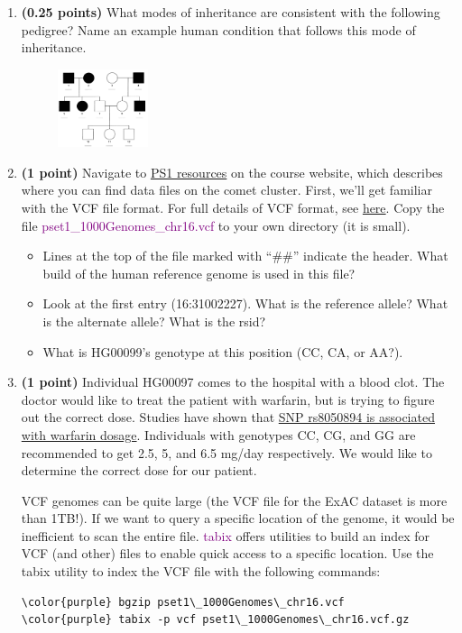 \documentclass[12pt]{article}
\begin{document}
\begin{enumerate}
\item \textbf{(0.25 points)} What modes of inheritance are consistent with the following pedigree? Name an example human condition that follows this mode of inheritance.

\begin{figure}[h!]
\centering
\includegraphics[width=100px]{pset1dominant.png}
\end{figure}

\pagebreak

\item \textbf{(1 point)} Navigate to \href{https://gymreklab.github.io/teaching/personal\_genomics/ps1\_resources.html}{PS1 resources} on the course website, which describes where you can find data files on the comet cluster. First, we'll get familiar with the VCF file format. For full details of VCF format, see \href{https://samtools.github.io/hts-specs/VCFv4.2.pdf}{here}. Copy the file \textcolor{purple}{pset1\_1000Genomes\_chr16.vcf} to your own directory (it is small).
\begin{itemize}
\item Lines at the top of the file marked with ``\#\#'' indicate the header. What build of the human reference genome is used in this file?
\item Look at the first entry (16:31002227). What is the reference allele? What is the alternate allele? What is the rsid?
\item What is HG00099's genotype at this position (CC, CA, or AA?).
\end{itemize}

\item \textbf{(1 point)} Individual HG00097 comes to the hospital with a blood clot. The doctor would like to treat the patient with warfarin, but is trying to figure out the correct dose. Studies have shown that \href{https://www.snpedia.com/index.php/Rs8050894}{SNP rs8050894 is associated with warfarin dosage}. Individuals with genotypes CC, CG, and GG are recommended to get 2.5, 5, and 6.5 mg/day respectively. We would like to determine the correct dose for our patient.

VCF genomes can be quite large (the VCF file for the ExAC dataset is more than 1TB!). If we want to query a specific location of the genome, it would be inefficient to scan the entire file. \textcolor{purple}{tabix} offers utilities to build an index for VCF (and other) files to enable quick access to a specific location. Use the tabix utility to index the VCF file with the following commands:
\begin{Verbatim}[commandchars=\\\{\}]
\color{purple} bgzip pset1\_1000Genomes\_chr16.vcf
\color{purple} tabix -p vcf pset1\_1000Genomes\_chr16.vcf.gz
\end{Verbatim}


\end{enumerate}
\end{document}
